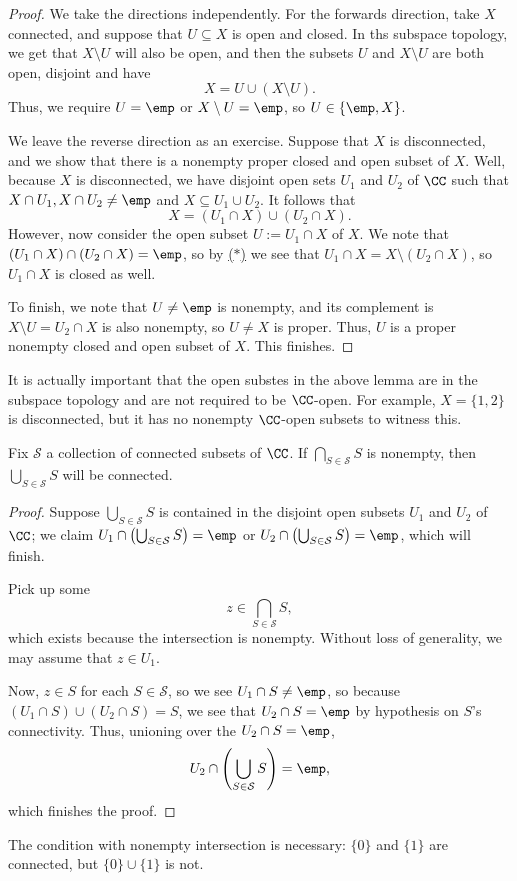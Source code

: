 \begin{proof}
	We take the directions independently. For the forwards direction, take $X$ connected, and suppose that $U\subseteq X$ is open and closed. In ths subspace topology, we get that $X\setminus U$ will also be open, and then the subsets $U$ and $X\setminus U$ are both open, disjoint and have
	\[X=U\cup(X\setminus U).\]
	Thus, we require $U=\emp$ or $X\setminus U=\emp$, so $U\in\{\emp,X\}$.

	We leave the reverse direction as an exercise. Suppose that $X$ is disconnected, and we show that there is a nonempty proper closed and open subset of $X$. Well, because $X$ is disconnected, we have disjoint open sets $U_1$ and $U_2$ of $\CC$ such that $X\cap U_1,X\cap U_2\ne\emp$ and $X\subseteq U_1\cup U_2$. It follows that
	\[X=(U_1\cap X)\cup(U_2\cap X).\tag{$*$}\label{eq:xdisconnect}\]
	However, now consider the open subset $U:=U_1\cap X$ of $X$. We note that $(U_1\cap X)\cap(U_2\cap X)=\emp$, so by \hyperref[eq:xdisconnect]{($*$)} we see that $U_1\cap X=X\setminus(U_2\cap X)$, so $U_1\cap X$ is closed as well.

	To finish, we note that $U\ne\emp$ is nonempty, and its complement is $X\setminus U=U_2\cap X$ is also nonempty, so $U\ne X$ is proper. Thus, $U$ is a proper nonempty closed and open subset of $X$. This finishes.
\end{proof}
\begin{remark}[Nir]
	It is actually important that the open substes in the above lemma are in the subspace topology and are not required to be $\CC$-open. For example, $X=\{1,2\}$ is disconnected, but it has no nonempty $\CC$-open subsets to witness this.
\end{remark}
\begin{lemma}
	Fix $\mathcal S$ a collection of connected subsets of $\CC$. If $\bigcap_{S\in\mathcal S}S$ is nonempty, then $\bigcup_{S\in\mathcal S}S$ will be connected.
\end{lemma}
\begin{proof}
	Suppose $\bigcup_{S\in\mathcal S}S$ is contained in the disjoint open subsets $U_1$ and $U_2$ of $\CC$; we claim $U_1\cap\left(\bigcup_{S\in\mathcal S}S\right)=\emp$ or $U_2\cap\left(\bigcup_{S\in\mathcal S}S\right)=\emp$, which will finish.
	
	Pick up some
	\[z\in\bigcap_{S\in\mathcal S}S,\]
	which exists because the intersection is nonempty. Without loss of generality, we may assume that $z\in U_1$.

	Now, $z\in S$ for each $S\in\mathcal S$, so we see $U_1\cap S\ne\emp$, so because $(U_1\cap S)\cup(U_2\cap S)=S$, we see that $U_2\cap S=\emp$ by hypothesis on $S$'s connectivity. Thus, unioning over the $U_2\cap S=\emp$,
	\[U_2\cap\left(\bigcup_{S\in\mathcal S}S\right)=\emp,\]
	which finishes the proof.
\end{proof}
\begin{remark}
	The condition with nonempty intersection is necessary: $\{0\}$ and $\{1\}$ are connected, but $\{0\}\cup\{1\}$ is not.
\end{remark}